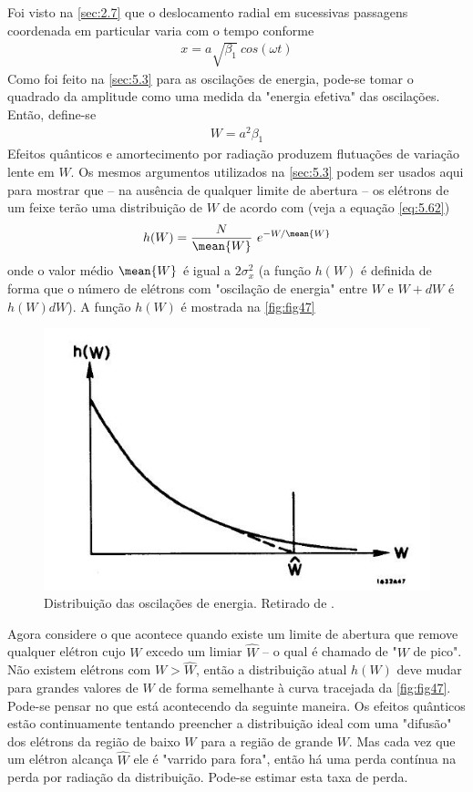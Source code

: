 Foi visto na \autoref{sec:2.7} que o deslocamento radial em sucessivas passagens coordenada em particular varia com o tempo conforme
\begin{align}
	x = a\sqrt{\beta_1}\ cos(\omega t)
\end{align}
Como foi feito na \autoref{sec:5.3} para as oscilações de energia, pode-se tomar o quadrado da amplitude como uma medida da "energia efetiva" das oscilações. Então, define-se
\begin{align}
	W = a^2 \beta_1
\end{align}
Efeitos quânticos e amortecimento por radiação produzem flutuações de variação lente em $W$. Os mesmos argumentos utilizados na \autoref{sec:5.3} podem ser usados aqui para mostrar que -- na ausência de qualquer limite de abertura -- os elétrons de um feixe terão uma distribuição de $W$ de acordo com (veja a equação \eqref{eq:5.62})
\begin{align}
	h(W) = \frac{N}{\mean{W}}\ e^{-W/\mean{W}}\label{eq:5.120}
\end{align}
onde o valor médio $\mean{W}$ é igual a $2\sigma_x^2$ (a função $h(W)$ é definida de forma que o número de elétrons com "oscilação de energia" entre $W$ e $W+dW$ é $h(W)dW$). A função $h(W)$ é mostrada na \autoref{fig:fig47}

\begin{figure}[!htb]
	\centering
	\includegraphics[width=0.6\linewidth]{./Figuras/fig47.jpeg}
	\caption{Distribuição das oscilações de energia. Retirado de \cite{sands1970physics}.}
	\label{fig:fig47}
\end{figure}

Agora considere o que acontece quando existe um limite de abertura que remove qualquer elétron cujo $W$ excedo um limiar $\hat{W}$ -- o qual é chamado de "$W$ de pico". Não existem elétrons com $W > \hat{W}$, então a distribuição atual $h(W)$ deve mudar para grandes valores de $W$ de forma semelhante à curva tracejada da \autoref{fig:fig47}. Pode-se pensar no que está acontecendo da seguinte maneira. Os efeitos quânticos estão continuamente tentando preencher a distribuição ideal com uma "difusão" dos elétrons da região de baixo $W$ para a região de grande $W$. Mas cada vez que um elétron alcança $\hat{W}$ ele é "varrido para fora", então há uma perda contínua na perda por radiação da distribuição. Pode-se estimar esta taxa de perda.

